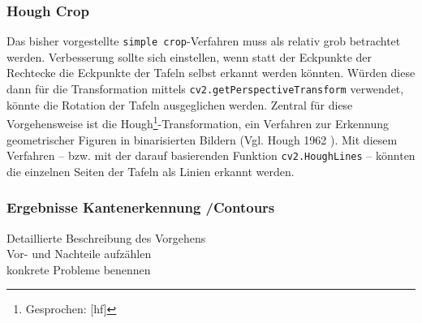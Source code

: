 \subsubsection*{Hough Crop}

Das bisher vorgestellte \verb|simple crop|-Verfahren muss als relativ grob betrachtet werden. Verbesserung sollte sich einstellen, wenn statt der Eckpunkte der Rechtecke die Eckpunkte der Tafeln selbst erkannt werden könnten. Würden diese dann für die Transformation mittels \verb|cv2.getPerspectiveTransform| verwendet, könnte die Rotation der Tafeln ausgeglichen werden.
Zentral für diese Vorgehensweise ist die Hough\footnote{Gesprochen: [h\textturnv{}f]}-Transformation, ein Verfahren zur Erkennung geometrischer Figuren in binarisierten Bildern (Vgl. Hough 1962 \cite{houghpatent}). Mit diesem Verfahren -- bzw. mit der darauf basierenden Funktion \verb|cv2.HoughLines| -- könnten die einzelnen Seiten der Tafeln als Linien erkannt werden. 


\subsubsection{Ergebnisse Kantenerkennung /Contours}
Detaillierte Beschreibung des Vorgehens\\
Vor- und Nachteile aufzählen\\
konkrete Probleme benennen\\
